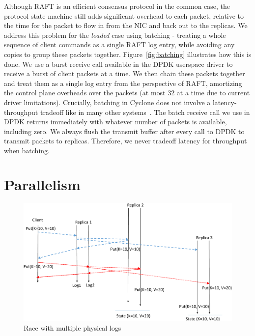 \documentclass[pageno]{jpaper}
\begin{document}
Although RAFT is an efficient consensus protocol in the common case, the
protocol state machine still adds significant overhead to each packet, relative
to the time for the packet to flow in from the NIC and back out to the replicas.
We address this problem for the \emph{loaded} case using batching - treating a
whole sequence of client commands as a single RAFT log entry, while avoiding any
copies to group these packets together. Figure~\ref{fig:batching} illustrates
how this is done. We use a burst receive call available in the DPDK userspace
driver to receive a burst of client packets at a time. We then chain these
packets together and treat them as a single log entry from the perspective of
RAFT, amortizing the control plane overheads over the packets (at most 32 at a
time due to current driver limitations). Crucially, batching in Cyclone does not
involve a latency-throughput tradeoff like in many other
systems~\cite{ix-dataplane}. The batch receive call we use in DPDK returns
immediately with whatever number of packets is available, including zero. We
always flush the transmit buffer after every call to DPDK to transmit packets to
replicas. Therefore, we never tradeoff latency for throughput when batching. 


\section{Parallelism}
\label{sec:parallelism}

\begin{figure}
  \centering
  \includegraphics[scale=0.35]{figures2/race.pdf}
  \caption{Race with multiple physical logs}
  \label{fig:race}
\end{figure}
\end{document}
